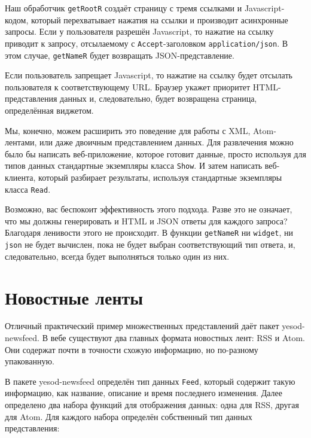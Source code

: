 
Наш обработчик \lstinline'getRootR' создаёт страницу с тремя ссылками и
Javascript-кодом, который перехватывает нажатия на ссылки и производит
асинхронные запросы. Если у пользователя разрешён Javascript, то нажатие на
ссылку приводит к запросу, отсылаемому с \verb*|Accept|-заголовком
\verb*|application/json|. В этом случае, \lstinline'getNameR' будет возвращать
JSON-представление.

Если пользователь запрещает Javascript, то нажатие на ссылку будет отсылать
пользователя к соответствующему URL. Браузер укажет приоритет
HTML-представления данных и, следовательно, будет возвращена страница,
определённая виджетом.

Мы, конечно, можем расширить это поведение для работы с XML, Atom-лентами, или
даже двоичным представлением данных. Для развлечения можно было бы написать
веб-приложение, которое готовит данные, просто используя для типов данных
стандартные экземпляры класса \lstinline'Show'. И затем написать веб-клиента,
который разбирает результаты, используя стандартные экземпляры класса
\lstinline'Read'.

\begin{remark}
    Возможно, вас беспокоит эффективность этого подхода. Разве это не означает,
    что мы должны генерировать и HTML и JSON ответы для каждого запроса?
    Благодаря ленивости этого не происходит. В функции \lstinline'getNameR' ни
    \lstinline'widget', ни \lstinline'json' не будет вычислен, пока не будет
    выбран соответствующий тип ответа, и, следовательно, всегда будет
    выполняться только один из них.
\end{remark}

\section{Новостные ленты}

Отличный практический пример множественных представлений даёт пакет
yesod-newsfeed. В вебе существуют два главных формата новостных лент: RSS и
Atom. Они содержат почти в точности схожую информацию, но по-разному
упакованную.

В пакете yesod-newsfeed определён тип данных \lstinline'Feed', который содержит
такую информацию, как название, описание и время последнего изменения. Далее
определено два набора функций для отображения данных: одна для RSS, другая для
Atom. Для каждого набора определён собственный тип данных представления:

